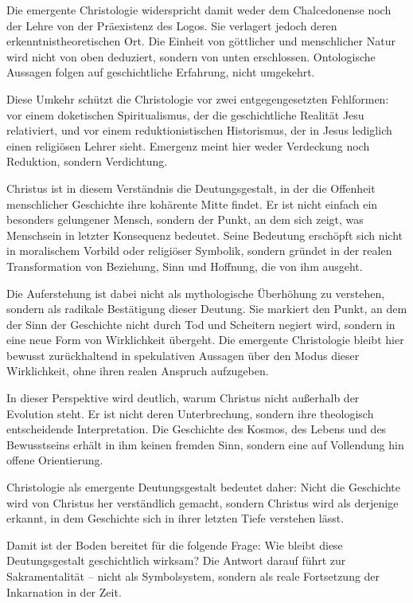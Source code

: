 \documentclass[
  ngerman,
]{article}
\begin{document}
Die emergente Christologie widerspricht damit weder dem Chalcedonense
noch der Lehre von der Präexistenz des Logos. Sie verlagert jedoch deren
erkenntnistheoretischen Ort. Die Einheit von göttlicher und menschlicher
Natur wird nicht von oben deduziert, sondern von unten erschlossen.
Ontologische Aussagen folgen auf geschichtliche Erfahrung, nicht
umgekehrt.

Diese Umkehr schützt die Christologie vor zwei entgegengesetzten
Fehlformen: vor einem doketischen Spiritualismus, der die geschichtliche
Realität Jesu relativiert, und vor einem reduktionistischen Historismus,
der in Jesus lediglich einen religiösen Lehrer sieht. Emergenz meint
hier weder Verdeckung noch Reduktion, sondern Verdichtung.

Christus ist in diesem Verständnis die Deutungsgestalt, in der die
Offenheit menschlicher Geschichte ihre kohärente Mitte findet. Er ist
nicht einfach ein besonders gelungener Mensch, sondern der Punkt, an dem
sich zeigt, was Menschsein in letzter Konsequenz bedeutet. Seine
Bedeutung erschöpft sich nicht in moralischem Vorbild oder religiöser
Symbolik, sondern gründet in der realen Transformation von Beziehung,
Sinn und Hoffnung, die von ihm ausgeht.

Die Auferstehung ist dabei nicht als mythologische Überhöhung zu
verstehen, sondern als radikale Bestätigung dieser Deutung. Sie markiert
den Punkt, an dem der Sinn der Geschichte nicht durch Tod und Scheitern
negiert wird, sondern in eine neue Form von Wirklichkeit übergeht. Die
emergente Christologie bleibt hier bewusst zurückhaltend in spekulativen
Aussagen über den Modus dieser Wirklichkeit, ohne ihren realen Anspruch
aufzugeben.

In dieser Perspektive wird deutlich, warum Christus nicht außerhalb der
Evolution steht. Er ist nicht deren Unterbrechung, sondern ihre
theologisch entscheidende Interpretation. Die Geschichte des Kosmos, des
Lebens und des Bewusstseins erhält in ihm keinen fremden Sinn, sondern
eine auf Vollendung hin offene Orientierung.

Christologie als emergente Deutungsgestalt bedeutet daher: Nicht die
Geschichte wird von Christus her verständlich gemacht, sondern Christus
wird als derjenige erkannt, in dem Geschichte sich in ihrer letzten
Tiefe verstehen lässt.

Damit ist der Boden bereitet für die folgende Frage: Wie bleibt diese
Deutungsgestalt geschichtlich wirksam? Die Antwort darauf führt zur
Sakramentalität -- nicht als Symbolsystem, sondern als reale Fortsetzung
der Inkarnation in der Zeit.
\end{document}
